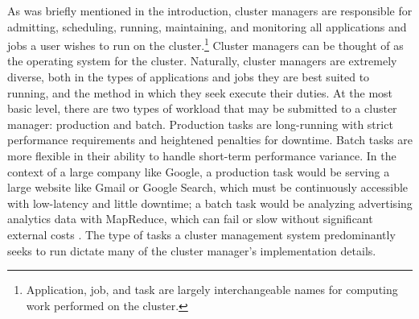 As was briefly mentioned in the introduction, cluster managers are responsible
for admitting, scheduling, running, maintaining, and monitoring all applications
and jobs a user wishes to run on the cluster.\footnote{Application, job, and
task are largely interchangeable names for computing work performed on the
cluster.} Cluster managers can be thought of as the
operating system for the cluster. Naturally, cluster managers are
extremely diverse, both in the types of applications and jobs they are best
suited to running, and the method in which they seek execute their duties.
At the most basic level, there are two types of workload that may be submitted
to a cluster manager: production and batch. Production tasks are long-running
with strict performance requirements and heightened penalties for downtime. Batch tasks are
more flexible in their ability to handle short-term performance variance. In the
context of a large company like Google, a production task would be serving a
large website like Gmail or Google Search, which must be continuously
accessible with low-latency
and little downtime; a batch task would be analyzing advertising analytics data
with MapReduce, which can fail or slow without significant external
costs \cite{borg}. The type of tasks a cluster management system
predominantly seeks to run dictate many of the cluster manager's implementation details.

